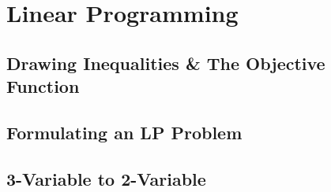\documentclass[../maths.tex]{subfiles}
\begin{document}
\chapter{Linear Programming}
\section{Drawing Inequalities \& The Objective Function}
\section{Formulating an LP Problem}
\section{3-Variable to 2-Variable}
\end{document}
